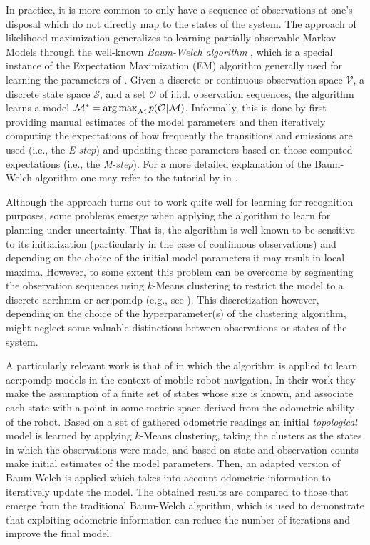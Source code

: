 In practice, it is more common to only have a sequence of observations at one's disposal which do not directly map to the states of the system.
The approach of likelihood maximization generalizes to learning partially observable Markov Models through the well-known \textit{Baum-Welch algorithm} \cite{welch2003hidden}, which is a special instance of the Expectation Maximization (EM) algorithm generally used for learning the parameters of .
Given a discrete or continuous observation space $\mathcal{V}$, a discrete state space $\mathcal{S}$, and a set $\mathcal{O}$ of i.i.d. observation sequences, the algorithm learns a model $\mathcal{M}^\ast = \operatorname*{arg\,max}_\mathcal{M} p(\mathcal{O}\vert\mathcal{M})$.
Informally, this is done by first providing manual estimates of the model parameters and then iteratively computing the expectations of how frequently the transitions and emissions are used (i.e., the \textit{E-step}) and updating these parameters based on those computed expectations (i.e., the \textit{M-step}).
For a more detailed explanation of the Baum-Welch algorithm one may refer to the tutorial by \citeauthor{bilmes1998gentle} in \cite{bilmes1998gentle}.

Although the approach turns out to work quite well for learning  for recognition purposes, some problems emerge when applying the algorithm to learn  for planning under uncertainty.
That is, the algorithm is well known to be sensitive to its initialization (particularly in the case of continuous observations) and depending on the choice of the initial model parameters it may result in local maxima.
However, to some extent this problem can be overcome by segmenting the observation sequences using $k$-Means clustering to restrict the model to a discrete \acrshort{acr:hmm} or \acrshort{acr:pomdp} (e.g., see \cite{calinon2007learning}).
This discretization however, depending on the choice of the hyperparameter(s) of the clustering algorithm, might neglect some valuable distinctions between observations or states of the system.

A particularly relevant work is that of \citeauthor{shatkay1997learning} \cite{shatkay1997learning} in which the algorithm is applied to learn \acrshort{acr:pomdp} models in the context of mobile robot navigation.
In their work they make the assumption of a finite set of states whose size is known, and associate each state with a point in some metric space derived from the odometric ability of the robot.
Based on a set of gathered odometric readings an initial \textit{topological} model is learned by applying $k$-Means clustering, taking the clusters as the states in which the observations were made, and based on state and observation counts make initial estimates of the model parameters.
Then, an adapted version of Baum-Welch is applied which takes into account odometric information to iteratively update the model.
The obtained results are compared to those that emerge from the traditional Baum-Welch algorithm, which is used to demonstrate that exploiting odometric information can reduce the number of iterations and improve the final model.

